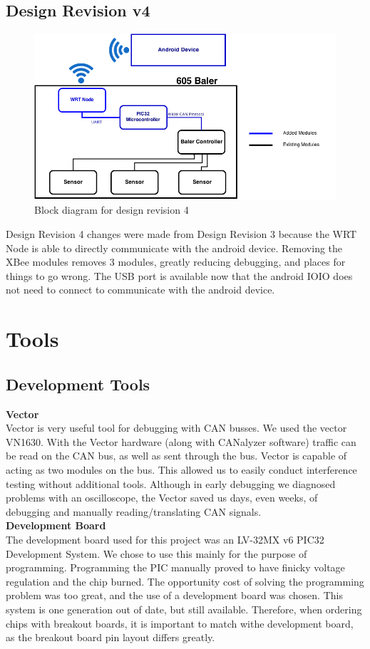 \documentclass[paper=a4, fontsize=11pt]{scrartcl}
\numberwithin{equation}{section}		%
\numberwithin{figure}{section}			%
\numberwithin{table}{section}				%
\begin{document}
\subsection{Design Revision v4} 
 \begin{figure}[ht]
	 \center\includegraphics[scale=0.5]{rev4.png}
 \caption{Block diagram for design revision 4}
 \end{figure}
Design Revision 4 changes were made from Design Revision 3 because the WRT Node is able to directly communicate with the android device. Removing the XBee modules removes 3 modules, greatly reducing debugging, and places for things to go wrong. The USB port is available now that the android IOIO does not need to connect to communicate with the android device.\\

\section{Tools}
\subsection{Development Tools}
\textbf{Vector}\\
Vector is very useful tool for debugging with CAN busses. We used the vector VN1630. With the Vector hardware (along with CANalyzer software) traffic can be read on the CAN bus, as well as sent through the bus. Vector is capable of acting as two modules on the bus. This allowed us to easily conduct interference testing without additional tools. Although in early debugging we diagnosed problems with an oscilloscope, the Vector saved us days, even weeks, of debugging and manually reading/translating CAN signals.\\

\textbf{Development Board}\\
The development board used for this project was an LV-32MX v6 PIC32 Development System. We chose to use this mainly for the purpose of programming. Programming the PIC manually proved to have finicky voltage regulation and the chip burned. The opportunity cost of solving the programming problem was too great, and the use of a development board was chosen. This system is one generation out of date, but still available. Therefore, when ordering chips with breakout boards, it is important to match withe development board, as the breakout board pin layout differs greatly.\\
\end{document}
